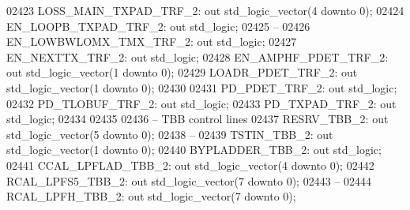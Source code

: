\begin{DoxyCode}
02423     LOSS\_MAIN\_TXPAD\_TRF\_2:  \textcolor{keywordflow}{out} \textcolor{comment}{std\_logic\_vector}(\textcolor{vhdllogic}{}\textcolor{vhdllogic}{4} \textcolor{keywordflow}{downto} \textcolor{vhdllogic}{}\textcolor{vhdllogic}{0});
02424     EN\_LOOPB\_TXPAD\_TRF\_2:   \textcolor{keywordflow}{out} \textcolor{comment}{std\_logic};
02425 \textcolor{keyword}{    --}
02426     EN\_LOWBWLOMX\_TMX\_TRF\_2: \textcolor{keywordflow}{out} \textcolor{comment}{std\_logic};
02427     EN\_NEXTTX\_TRF\_2:    \textcolor{keywordflow}{out} \textcolor{comment}{std\_logic};
02428     EN\_AMPHF\_PDET\_TRF\_2:    \textcolor{keywordflow}{out} \textcolor{comment}{std\_logic\_vector}(\textcolor{vhdllogic}{}\textcolor{vhdllogic}{1} \textcolor{keywordflow}{downto} \textcolor{vhdllogic}{}\textcolor{vhdllogic}{0});
02429     LOADR\_PDET\_TRF\_2:   \textcolor{keywordflow}{out} \textcolor{comment}{std\_logic\_vector}(\textcolor{vhdllogic}{}\textcolor{vhdllogic}{1} \textcolor{keywordflow}{downto} \textcolor{vhdllogic}{}\textcolor{vhdllogic}{0});
02430 
02431     PD\_PDET\_TRF\_2:  \textcolor{keywordflow}{out} \textcolor{comment}{std\_logic};
02432     PD\_TLOBUF\_TRF\_2:    \textcolor{keywordflow}{out} \textcolor{comment}{std\_logic};
02433     PD\_TXPAD\_TRF\_2: \textcolor{keywordflow}{out} \textcolor{comment}{std\_logic};
02434 
02435 
02436 \textcolor{keyword}{    -- TBB control lines}
02437     RESRV\_TBB\_2:    \textcolor{keywordflow}{out} \textcolor{comment}{std\_logic\_vector}(\textcolor{vhdllogic}{}\textcolor{vhdllogic}{5} \textcolor{keywordflow}{downto} \textcolor{vhdllogic}{}\textcolor{vhdllogic}{0});
02438 \textcolor{keyword}{    --}
02439     TSTIN\_TBB\_2:    \textcolor{keywordflow}{out} \textcolor{comment}{std\_logic\_vector}(\textcolor{vhdllogic}{}\textcolor{vhdllogic}{1} \textcolor{keywordflow}{downto} \textcolor{vhdllogic}{}\textcolor{vhdllogic}{0});
02440     BYPLADDER\_TBB\_2:    \textcolor{keywordflow}{out} \textcolor{comment}{std\_logic};
02441     CCAL\_LPFLAD\_TBB\_2:  \textcolor{keywordflow}{out} \textcolor{comment}{std\_logic\_vector}(\textcolor{vhdllogic}{}\textcolor{vhdllogic}{4} \textcolor{keywordflow}{downto} \textcolor{vhdllogic}{}\textcolor{vhdllogic}{0});
02442     RCAL\_LPFS5\_TBB\_2:   \textcolor{keywordflow}{out} \textcolor{comment}{std\_logic\_vector}(\textcolor{vhdllogic}{}\textcolor{vhdllogic}{7} \textcolor{keywordflow}{downto} \textcolor{vhdllogic}{}\textcolor{vhdllogic}{0});
02443 \textcolor{keyword}{    --}
02444     RCAL\_LPFH\_TBB\_2:    \textcolor{keywordflow}{out} \textcolor{comment}{std\_logic\_vector}(\textcolor{vhdllogic}{}\textcolor{vhdllogic}{7} \textcolor{keywordflow}{downto} \textcolor{vhdllogic}{}\textcolor{vhdllogic}{0});

\end{DoxyCode}
